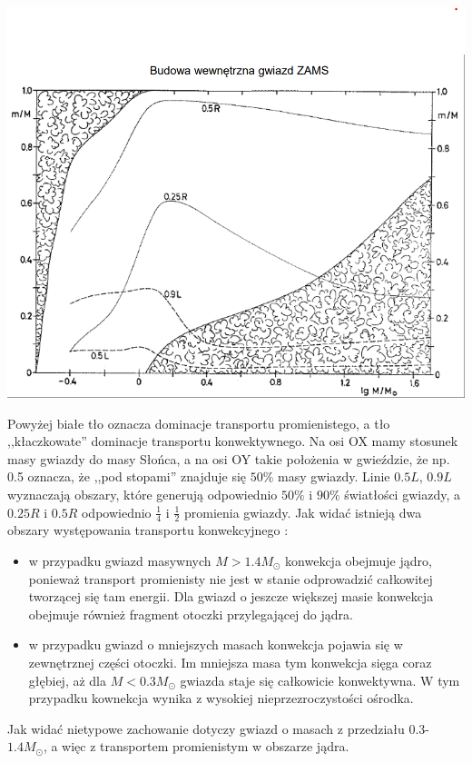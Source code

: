 \documentclass[../index.tex]{subfiles}
\begin{document}
            \begin{center}
                \includegraphics[width=15cm]{images/budowaGwiazdZAMS.png}
            \end{center}
            Powyżej białe tło oznacza dominacje transportu promienistego, a tło ,,kłaczkowate'' dominacje transportu konwektywnego. Na osi OX mamy stosunek masy gwiazdy do masy Słońca, a na osi OY takie położenia w gwieździe, że np. 0.5 oznacza, że ,,pod stopami'' znajduje się \(50\%\) masy gwiazdy. Linie \(0.5 L\), \(0.9 L\) wyznaczają obszary, które generują odpowiednio \(50\%\) i \(90\%\) światłości gwiazdy, a \(0.25R\) i \(0.5R\) odpowiednio \(\frac{1}{4}\) i \(\frac{1}{2}\) promienia gwiazdy. Jak widać istnieją dwa obszary występowania transportu konwekcyjnego : 
            \begin{itemize}
                \item w przypadku gwiazd masywnych \(M > 1.4 M_\odot\) konwekcja obejmuje jądro, ponieważ transport promienisty nie jest w stanie odprowadzić całkowitej tworzącej się tam energii. Dla gwiazd o jeszcze większej masie konwekcja obejmuje również fragment otoczki przylegającej do jądra.
                \item w przypadku gwiazd o mniejszych masach konwekcja pojawia się w zewnętrznej części otoczki. Im mniejsza masa tym konwekcja sięga coraz głębiej, aż dla \(M < 0.3 M_\odot\) gwiazda staje się całkowicie konwektywna. W tym przypadku kownekcja wynika z wysokiej nieprzezroczystości ośrodka.
            \end{itemize}
            Jak widać nietypowe zachowanie dotyczy gwiazd o masach z przedziału \(0.3\)-\(1.4 M_\odot\), a więc z transportem promienistym w obszarze jądra.
\end{document}
